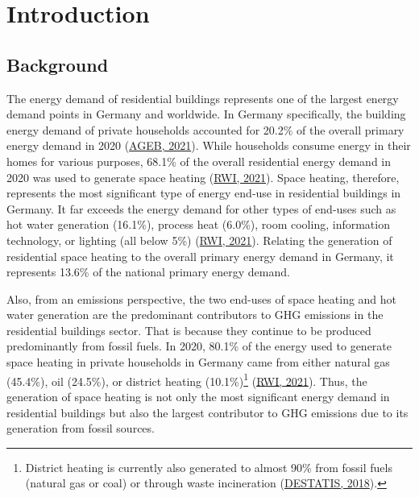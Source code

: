 \documentclass[12pt,twoside]{reedthesis}
\begin{document}
\mainmatter %
\pagestyle{fancyplain} %

\setlength{\parskip}{6pt} %

\hypertarget{introduction}{%
\chapter{Introduction}\label{introduction}}

\hypertarget{background}{%
\section{Background}\label{background}}

The energy demand of residential buildings represents one of the largest energy demand points in Germany and worldwide. In Germany specifically, the building energy demand of private households accounted for 20.2\% of the overall primary energy demand in 2020 (\protect\hyperlink{ref-ageb21}{AGEB, 2021}). While households consume energy in their homes for various purposes, 68.1\% of the overall residential energy demand in 2020 was used to generate space heating (\protect\hyperlink{ref-rwi21}{RWI, 2021}). Space heating, therefore, represents the most significant type of energy end-use in residential buildings in Germany. It far exceeds the energy demand for other types of end-uses such as hot water generation (16.1\%), process heat (6.0\%), room cooling, information technology, or lighting (all below 5\%) (\protect\hyperlink{ref-rwi21}{RWI, 2021}). Relating the generation of residential space heating to the overall primary energy demand in Germany, it represents 13.6\% of the national primary energy demand.

Also, from an emissions perspective, the two end-uses of space heating and hot water generation are the predominant contributors to GHG emissions in the residential buildings sector. That is because they continue to be produced predominantly from fossil fuels. In 2020, 80.1\% of the energy used to generate space heating in private households in Germany came from either natural gas (45.4\%), oil (24.5\%), or district heating (10.1\%)\footnote{District heating is currently also generated to almost 90\% from fossil fuels (natural gas or coal) or through waste incineration (\protect\hyperlink{ref-destatis18}{DESTATIS, 2018}).} (\protect\hyperlink{ref-rwi21}{RWI, 2021}). Thus, the generation of space heating is not only the most significant energy demand in residential buildings but also the largest contributor to GHG emissions due to its generation from fossil sources.
\end{document}

